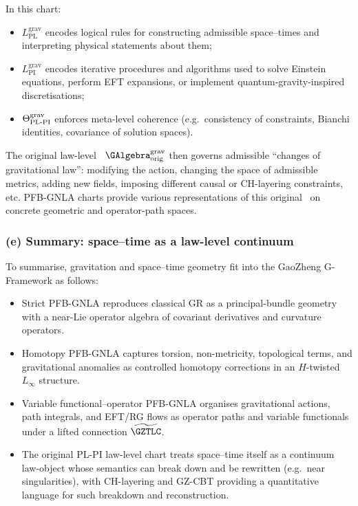 \documentclass[11pt]{book}
\theoremstyle{plain}
\theoremstyle{definition}
\begin{document}
In this chart:

\begin{itemize}
  \item $L_{\mathrm{PL}}^{\mathrm{grav}}$ encodes logical rules for
        constructing admissible space--times and interpreting physical
        statements about them;
  \item $L_{\mathrm{PI}}^{\mathrm{grav}}$ encodes iterative procedures
        and algorithms used to solve Einstein equations, perform
        EFT expansions, or implement quantum-gravity-inspired
        discretisations;
  \item $\Theta_{\mathrm{PL\text- PI}}^{\mathrm{grav}}$ enforces
        meta-level coherence (e.g.\ consistency of constraints, Bianchi
        identities, covariance of solution spaces).
\end{itemize}

The original law-level \GAlgebra\ $\GAlgebra_{\mathrm{orig}}^{\mathrm{grav}}$
then governs admissible “changes of gravitational law”: modifying the
action, changing the space of admissible metrics, adding new fields,
imposing different causal or CH-layering constraints, etc.
PFB-GNLA charts provide various representations of this original
\GAlgebra\ on concrete geometric and operator-path spaces.



\subsubsection*{(e) Summary: space--time as a law-level continuum}

To summarise, gravitation and space--time geometry fit into the
GaoZheng G-Framework as follows:

\begin{itemize}
  \item Strict PFB-GNLA reproduces classical GR as a principal-bundle
        geometry with a near-Lie operator algebra of covariant
        derivatives and curvature operators.
  \item Homotopy PFB-GNLA captures torsion, non-metricity, topological
        terms, and gravitational anomalies as controlled homotopy
        corrections in an $H$-twisted $L_\infty$ structure.
  \item Variable functional--operator PFB-GNLA organises gravitational
        actions, path integrals, and EFT/RG flows as operator paths and
        variable functionals under a lifted connection
        $\widetilde{\GZTLC}$.
  \item The original PL-PI law-level chart treats space--time itself as
        a continuum law-object whose semantics can break down and be
        rewritten (e.g.\ near singularities), with CH-layering and
        GZ-CBT providing a quantitative language for such breakdown and
        reconstruction.
\end{itemize}
\end{document}
